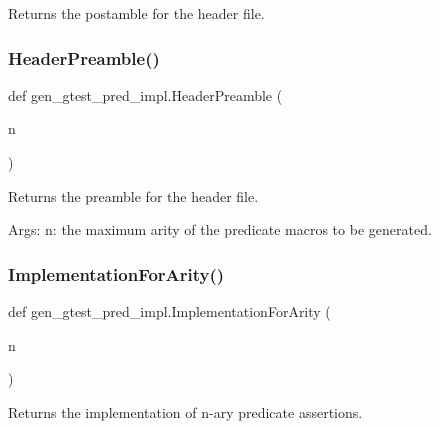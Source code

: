 \begin{DoxyVerb}Returns the postamble for the header file.\end{DoxyVerb}
 \mbox{\label{namespacegen__gtest__pred__impl_a0b99cadcffab4bf161654a382163bac8}} 
\subsubsection{\texorpdfstring{HeaderPreamble()}{HeaderPreamble()}}
{\footnotesize\ttfamily def gen\+\_\+gtest\+\_\+pred\+\_\+impl.\+Header\+Preamble (\begin{DoxyParamCaption}\item[{}]{n }\end{DoxyParamCaption})}

\begin{DoxyVerb}Returns the preamble for the header file.

Args:
  n:  the maximum arity of the predicate macros to be generated.
\end{DoxyVerb}
 \mbox{\label{namespacegen__gtest__pred__impl_a8c53b141b89f9c05d0131d9756dfeab0}} 
\subsubsection{\texorpdfstring{ImplementationForArity()}{ImplementationForArity()}}
{\footnotesize\ttfamily def gen\+\_\+gtest\+\_\+pred\+\_\+impl.\+Implementation\+For\+Arity (\begin{DoxyParamCaption}\item[{}]{n }\end{DoxyParamCaption})}

\begin{DoxyVerb}Returns the implementation of n-ary predicate assertions.\end{DoxyVerb}
 \mbox{\label{namespacegen__gtest__pred__impl_ac016218b7c9437d1d5ac85c574c83069}} 
